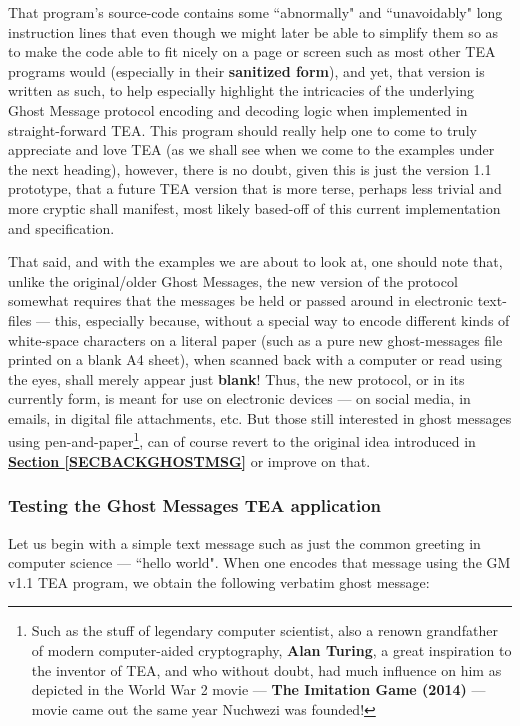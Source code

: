 \documentclass[a4paper, 18pt]{book} %
\begin{document}
{{{That program's source-code contains some ``abnormally" and ``unavoidably" long instruction lines that even though we might later be able to simplify them so as to make the code able to fit nicely on a page or screen such as most other TEA programs would (especially in their \textbf{sanitized form}), and yet, that version is written as such, to help especially highlight the intricacies of the underlying Ghost Message protocol encoding and decoding logic when implemented in straight-forward TEA. This program should really help one to come to truly appreciate and love TEA (as we shall see when we come to the examples under the next heading), however, there is no doubt, given this is just the version 1.1 prototype, that a future TEA version that is more terse, perhaps less trivial and more cryptic shall manifest, most likely based-off of this current implementation and specification.

\vspace{2em}

That said, and with the examples we are about to look at, one should note that, unlike the original/older Ghost Messages, the new version of the protocol somewhat requires that the messages be held or passed around in electronic text-files --- this, especially because, without a special way to encode different kinds of white-space characters on a literal paper (such as a pure new ghost-messages file printed on a blank A4 sheet), when scanned back with a computer or read using the eyes, shall merely appear just \textbf{blank}! Thus, the new protocol, or in its currently form, is meant for use on electronic devices --- on social media, in emails, in digital file attachments, etc. But those still interested in ghost messages using pen-and-paper\footnote{Such as the stuff of legendary computer scientist, also a renown grandfather of modern computer-aided cryptography, \textbf{Alan Turing}, a great inspiration to the inventor of TEA, and who without doubt, had much influence on him as depicted in the World War 2 movie --- \textbf{The Imitation Game (2014)} --- movie came out the same year Nuchwezi was founded!}, can of course revert to the original idea introduced in \textbf{\hyperref[SECBACKGHOSTMSG]{Section \ref{SECBACKGHOSTMSG}}} or improve on that.


\subsubsection{Testing the Ghost Messages TEA application}


Let us begin with a simple  text message such as just the common greeting in computer science --- ``hello world". When one encodes that message using the GM v1.1 TEA program, we obtain the following verbatim ghost message:


}}}
\end{document}
